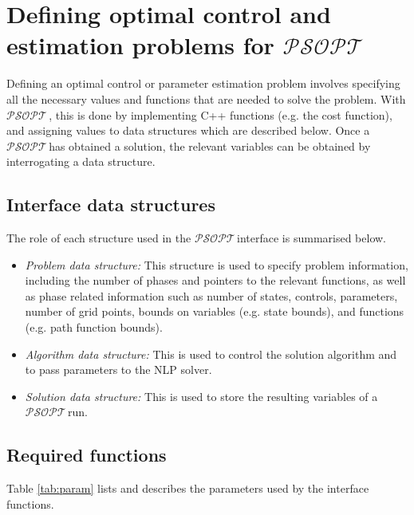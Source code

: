 \documentclass[a4paper,11pt]{report}    %
\newcommand{\psopt}{$\mathcal{PSOPT}$\,}  %
\begin{document}

\chapter{Defining optimal control and estimation problems for \psopt}

Defining an optimal control or parameter estimation problem involves specifying all the necessary values and functions that
are needed to solve the problem. With \psopt, this is done by implementing C++ functions (e.g. the cost function),
and assigning values to data structures which are described below. Once a \psopt has obtained a solution,
the relevant variables can be obtained by interrogating a data structure.


\section{Interface data structures}


The role of each structure used in the \psopt interface is summarised below.

\begin{itemize}
 \item \textit{Problem data structure:} This structure is used to specify problem information, including
the number of phases and pointers to the relevant functions, as well as phase related information such as
number of states, controls, parameters, number of grid points, bounds on variables (e.g. state bounds),
and functions (e.g. path function bounds).
 \item \textit{Algorithm data structure: }This is used to control the solution algorithm and to pass parameters
to the NLP solver. 
 \item \textit{Solution data structure:} This is used to store the resulting variables of a \psopt run. 
\end{itemize}




\section{Required functions}

Table \ref{tab:param} lists and describes the parameters used by the interface functions.
\end{document}
